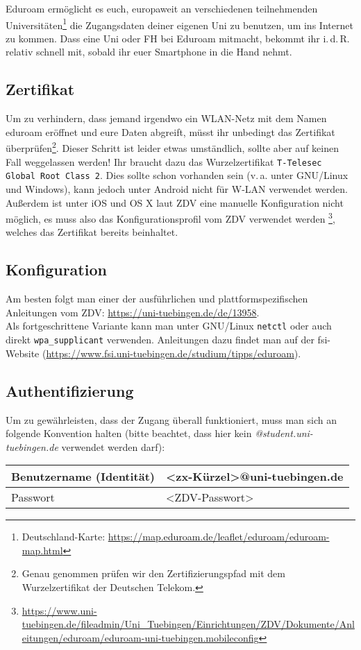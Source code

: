 Eduroam ermöglicht es euch, europaweit an verschiedenen teilnehmenden
Universitäten\footnote{Deutschland-Karte:
\url{https://map.eduroam.de/leaflet/eduroam/eduroam-map.html}} die Zugangsdaten
deiner eigenen Uni zu benutzen, um ins Internet zu kommen. Dass eine Uni oder
FH bei Eduroam mitmacht, bekommt ihr i.\,d.\,R. relativ schnell mit, sobald ihr
euer Smartphone in die Hand nehmt.

\subsection*{Zertifikat}
  Um zu verhindern, dass jemand irgendwo ein WLAN-Netz mit dem Namen eduroam
  eröffnet und eure Daten abgreift, müsst ihr unbedingt das Zertifikat
  überprüfen\footnote{Genau genommen prüfen wir den Zertifizierungspfad mit dem
  Wurzelzertifikat der Deutschen Telekom.}. Dieser Schritt ist leider etwas
  umständlich, sollte aber auf keinen Fall weggelassen werden! Ihr braucht dazu das Wurzelzertifikat \glqq\texttt{T-Telesec Global Root Class 2}\grqq. Dies
  sollte schon vorhanden sein (v.\,a. unter GNU/Linux und Windows), kann
  jedoch unter Android nicht für W-LAN verwendet werden. Außerdem ist unter iOS
  und OS X laut ZDV eine manuelle Konfiguration nicht möglich, es muss also das
  Konfigurationsprofil vom ZDV verwendet werden
  \footnote{\url{https://www.uni-tuebingen.de/fileadmin/Uni_Tuebingen/Einrichtungen/ZDV/Dokumente/Anleitungen/eduroam/eduroam-uni-tuebingen.mobileconfig}},
  welches das Zertifikat bereits beinhaltet.

\subsection*{Konfiguration}
  Am besten folgt man einer der ausführlichen und plattformspezifischen
  Anleitungen vom ZDV:
  \url{https://uni-tuebingen.de/de/13958}.\\
  Als fortgeschrittene Variante kann man unter GNU/Linux \texttt{netctl} oder auch
  direkt \texttt{wpa\_supplicant} verwenden. Anleitungen dazu findet man auf der
  fsi-Website (\url{https://www.fsi.uni-tuebingen.de/studium/tipps/eduroam}).

\subsection*{Authentifizierung}
  Um zu gewährleisten, dass der Zugang überall funktioniert, muss man sich an
  folgende Konvention halten (bitte beachtet, dass hier kein
  \emph{@student.uni-tuebingen.de} verwendet werden darf): \medskip \\
  \begin{tabular}{l|l}
    Benutzername (Identität) & <zx-Kürzel>@uni-tuebingen.de \\ \hline
    Passwort                 & <ZDV-Passwort>
  \end{tabular}

\vfill
